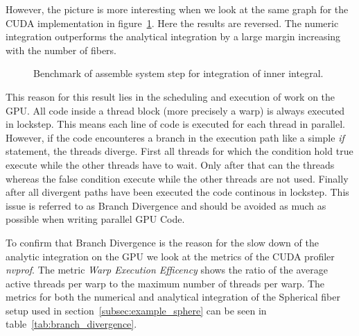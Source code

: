 \documentclass[a4paper,11pt]{kth-mag}
\begin{document}
However, the picture is more interesting when we look at the same graph for the CUDA implementation in figure~\ref{fig:cuda_num_vs_anal}. Here the results are reversed. The numeric integration outperforms the analytical integration by a large margin increasing with the number of fibers.

\begin{figure}
  \centering
  \caption{Benchmark of assemble system step for integration of inner integral.}
  \label{fig:cuda_num_vs_anal}
\end{figure}

This reason for this result lies in the scheduling and execution of work on the GPU. All code inside a thread block (more precisely a warp) is always executed in lockstep. This means each line of code is executed for each thread in parallel. However, if the code encounteres a branch in the execution path like a simple \emph{if} statement, the threads diverge. First all threads for which the condition hold true execute while the other threads have to wait. Only after that can the threads whereas the false condition execute while the other threads are not used. Finally after all divergent paths have been executed the code continous in lockstep. This issue is referred to as Branch Divergence and should be avoided as much as possible when writing parallel GPU Code.

To confirm that Branch Divergence is the reason for the slow down of the analytic integration on the GPU we look at the metrics of the CUDA profiler \emph{nvprof}. The metric \emph{Warp Execution Efficency} shows the ratio of the average active threads per warp to the maximum number of threads per warp. The metrics for both the numerical and analytical integration of the Spherical fiber setup used in section~\ref{subsec:example_sphere} can be seen in table~\ref{tab:branch_divergence}.
\end{document}
